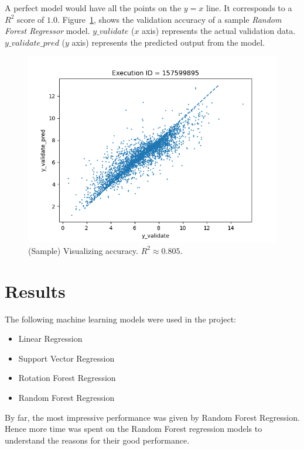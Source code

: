 \documentclass[11pt]{article}
\begin{document}
A perfect model would have all the points on the $y = x$ line. It corresponds to a $R^2$ score of $1.0$. 
Figure~\ref{fig:modelQualityVisualization},  shows the validation accuracy of a sample \textit{Random Forest Regressor} model.
$y\_validate$ ($x$ axis) represents the actual validation data.
$y\_validate\_pred$ ($y$ axis) represents the predicted output from the model.

\begin{figure}[htb]
  \centering
    \includegraphics[width=1.0\textwidth]{images/accuracy_validate}
    \caption{(Sample) Visualizing accuracy.  $R^2 \approx 0.805$.}
    \label{fig:modelQualityVisualization}
\end{figure}


\section{Results}
\label{MachineLearningModelslabel}
The following machine learning models were used in the project:
\begin{itemize}
\item Linear Regression
\item Support Vector Regression
\item Rotation Forest Regression
\item Random Forest Regression
\end{itemize}

By far, the most impressive performance was given by Random Forest Regression.
Hence more time was spent on the Random Forest regression models to understand the reasons for their good performance.
\end{document}
